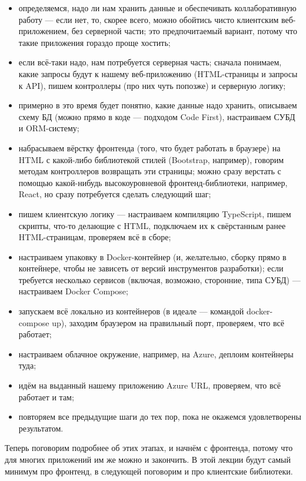 \documentclass{../../text-style}
\begin{document}
\begin{itemize}
    \item определяемся, надо ли нам хранить данные и обеспечивать коллаборативную работу --- если нет, то, скорее всего, можно обойтись чисто клиентским веб-приложением, без серверной части; это предпочитаемый вариант, потому что такие приложения гораздо проще хостить;
    \item если всё-таки надо, нам потребуется серверная часть; сначала понимаем, какие запросы будут к нашему веб-приложению (HTML-страницы и запросы к API), пишем контроллеры (про них чуть попозже) и серверную логику;
    \item примерно в это время будет понятно, какие данные надо хранить, описываем схему БД (можно прямо в коде --- подходом Code First), настраиваем СУБД и ORM-систему;
    \item набрасываем вёрстку фронтенда (того, что будет работать в браузере) на HTML с какой-либо библиотекой стилей (Bootstrap, например), говорим методам контроллеров возвращать эти страницы; можно сразу верстать с помощью какой-нибудь высокоуровневой фронтенд-библиотеки, например, React, но сразу потребуется сделать следующий шаг;
    \item пишем клиентскую логику --- настраиваем компиляцию TypeScript, пишем скрипты, что-то делающие с HTML, подключаем их к свёрстанным ранее HTML-страницам, проверяем всё в сборе;
    \item настраиваем упаковку в Docker-контейнер (и, желательно, сборку прямо в контейнере, чтобы не зависеть от версий инструментов разработки); если требуется несколько сервисов (включая, возможно, сторонние, типа СУБД) --- настраиваем Docker Compose;
    \item запускаем всё локально из контейнеров (в идеале --- командой docker-compose up), заходим браузером на правильный порт, проверяем, что всё работает;
    \item настраиваем облачное окружение, например, на Azure, деплоим контейнеры туда;
    \item идём на выданный нашему приложению Azure URL, проверяем, что всё работает и там;
    \item повторяем все предыдущие шаги до тех пор, пока не окажемся удовлетворены результатом.
\end{itemize}

Теперь поговорим подробнее об этих этапах, и начнём с фронтенда, потому что для многих приложений им же можно и закончить. В этой лекции будут самый минимум про фронтенд, в следующей поговорим и про клиентские библиотеки.
\end{document}
